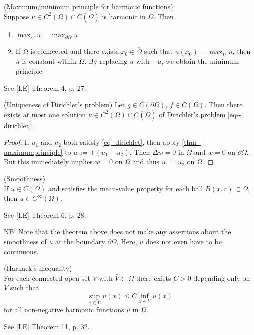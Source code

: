 \documentclass[11pt]{article}
\begin{document}
			\begin{thm}\label{thm--maximumprinciple}
				(Maximum/minimum principle for harmonic functions)\\
				Suppose $u\in C^2(\Omega)\cap C(\bar{\Omega})$ is harmonic in $\Omega$. Then
				\begin{enumerate}
					\item $\max_{\bar{\Omega}} u=\max_{\partial\Omega}u$
					\item If $\Omega$ is connected and there exists $x_0\in\overset{\circ}{\Omega}$ such that $u(x_0)=\max_{\bar{\Omega}}u$, then $u$ is constant within $\Omega$. By replacing $u$ with $-u$, we obtain the minimum principle.
				\end{enumerate}
			\end{thm}
			\begin{pproof}
				See [LE] Theorem 4, p. 27.
			\end{pproof}

			\begin{cor}
				(Uniqueness of Dirichlet's problem) Let $g\in C(\partial\Omega)$, $f\in C(\Omega)$. Then there exists at most one solution $u\in C^2(\Omega)\cap C(\bar{\Omega})$ of Dirichlet's problem \eqref{eq--dirichlet}.
			\end{cor}
			\begin{proof}
				If $u_1$ and $u_2$ both satisfy \eqref{eq--dirichlet}, then apply \autoref{thm--maximumprinciple} to $w:=\pm(u_1-u_2)$. Then $\Delta w=0$ in $\Omega$ and $w=0$ on $\partial\Omega$. But this immediately implies $w=0$ on $\Omega$ and thus $u_1=u_2$ on $\Omega$.
			\end{proof}

			\begin{thm}(Smoothness)\\
				If $u\in C(\Omega)$ and satisfies the mean-value property for each ball $B(x,r)\subset\Omega$, then $u\in C^\infty(\Omega)$.
			\end{thm}
			\begin{pproof}
				See [LE] Theorem 6, p. 28.
			\end{pproof}

			\noindent\underline{NB}: Note that the theorem above does not make any assertions about the smoothness of $u$ at the boundary $\partial\Omega$. Here, $u$ does not even have to be continuous.

			\begin{thm}
				(Harnack's inequality)\\
				For each connected open set $V$ with $\bar{V}\subset\Omega$ there exists $C>0$ depending only on $V$ such that
				\begin{equation*}
					\sup_{x\in V}u(x)\le C\inf_{x\in V}u(x)
				\end{equation*}
				for all non-negative harmonic functions $u$ in $\Omega$.
			\end{thm}
			\begin{pproof}
				See [LE] Theorem 11, p. 32.
			\end{pproof}
\end{document}
